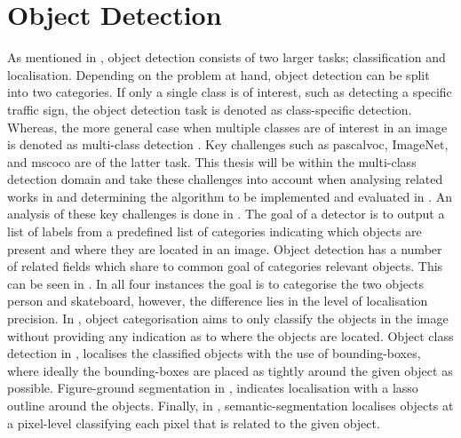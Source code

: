 \section{Object Detection}
As mentioned in , object detection consists of two larger tasks; classification and localisation. Depending on the problem at hand, object detection can be split into two categories. If only a single class is of interest, such as detecting a specific traffic sign, the object detection task is denoted as class-specific detection. Whereas, the more general case when multiple classes are of interest in an image is denoted as multi-class detection \cite{zhang}. Key challenges such as \gls{pascalvoc}, ImageNet, and \gls{mscoco} are of the latter task. This thesis will be within the multi-class detection domain and take these challenges into account when analysing related works in  and determining the algorithm to be implemented and evaluated in . An analysis of these key challenges is done in . The goal of a detector is to output a list of labels from a predefined list of categories indicating which objects are present and where they are located in an image. Object detection has a number of related fields which share to common goal of categories relevant objects. This can be seen in . In all four instances the goal is to categorise the two objects person and skateboard, however, the difference lies in the level of localisation precision. In , object categorisation aims to only classify the objects in the image without providing any indication as to where the objects are located. Object class detection in , localises the classified objects with the use of bounding-boxes, where ideally the bounding-boxes are placed as tightly around the given object as possible. Figure-ground segmentation in , indicates localisation with a lasso outline around the objects. Finally, in , semantic-segmentation localises objects at a pixel-level classifying each pixel that is related to the given object. 



